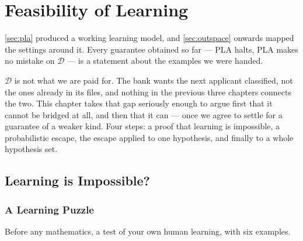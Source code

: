 \chapter{Feasibility of Learning}

\begin{prev}
    \autoref{sec:pla} produced a working learning model, and \autoref{sec:outspace}
    onwards mapped the settings around it. Every guarantee obtained so far ---
    PLA halts, PLA makes no mistake on \(\mathcal{D}\) --- is a statement about
    the examples we were handed.
\end{prev}

\(\mathcal{D}\) is not what we are paid for. The bank wants the next applicant
classified, not the ones already in its files, and nothing in the previous three
chapters connects the two. This chapter takes that gap seriously enough to argue
first that it cannot be bridged at all, and then that it can --- once we agree to
settle for a guarantee of a weaker kind. Four steps: a proof that learning is
impossible, a probabilistic escape, the escape applied to one hypothesis, and
finally to a whole hypothesis set.

\section{Learning is Impossible?}\label{sec:nfl}


\subsection{A Learning Puzzle}

Before any mathematics, a test of your own human learning, with six examples.

\begin{center}
\end{center}

